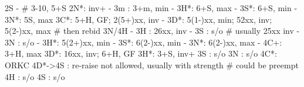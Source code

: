 2S - # 3-10, 5+S
2N*: inv+
   - 3m : 3+m, min
   - 3H*: 6+S, max
   - 3S*: 6+S, min
   - 3N*: 5S, max
3C*: 5+H, GF; 2(5+)xx, inv
   - 3D*: 5(1-)xx, min; 52xx, inv; 5(2-)xx, max  # then rebid 3N/4H
        - 3H : 26xx, inv
        - 3S : s/o  # usually 25xx inv
        - 3N : s/o
   - 3H*: 5(2+)xx, min
   - 3S*: 6(2-)xx, min
   - 3N*: 6(2-)xx, max
   - 4C+: 3+H, max
3D*: 16xx, inv; 6+H, GF
3H*: 3+S, inv+
3S : s/o
3N : s/o
4C*: ORKC
4D*->4S : re-raise not allowed, usually with strength  # could be preempt
4H : s/o
4S : s/o
